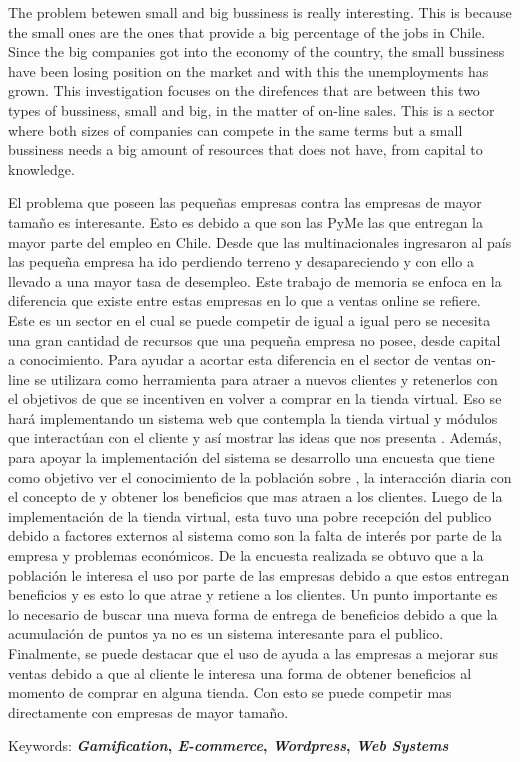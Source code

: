 The problem betewen small and big bussiness is really interesting. This is because the small ones are the ones
that provide a big percentage of the jobs in Chile. Since the big companies got into the economy of the country,
the small bussiness have been losing position on the market and with this the unemployments has grown.
This investigation focuses on the direfences that are between this two types of bussiness, small and big, 
in the matter of on-line sales. This is a sector where both sizes of companies can compete in the same terms but
a small bussiness needs a big amount of resources that does not have, from capital to knowledge.




El problema que poseen las pequeñas empresas contra las empresas de mayor tamaño es interesante. Esto es debido
a que son las PyMe las que entregan la mayor parte del empleo en Chile. Desde que las multinacionales ingresaron
al país las pequeña empresa ha ido perdiendo terreno y desapareciendo y con ello a llevado a una mayor tasa de
desempleo.
Este trabajo de memoria se enfoca en la diferencia que existe entre estas empresas en lo que a ventas online
se refiere. Este es un sector en el cual se puede competir de igual a igual pero se necesita una gran cantidad de
recursos que una pequeña empresa no posee, desde capital a conocimiento.
Para ayudar a acortar esta diferencia en el sector de ventas on-line se utilizara {\gam} como herramienta para
atraer a nuevos clientes y retenerlos con el objetivos de que se incentiven en volver a comprar en la tienda virtual.
Eso se hará implementando un sistema web que contempla la tienda virtual y módulos que interactúan con el cliente
y así mostrar las ideas que nos presenta {\gam}. Además, para apoyar la implementación del sistema se desarrollo
una encuesta que tiene como objetivo ver el conocimiento de la población sobre {\gam}, la interacción diaria con el
concepto de {\gam} y obtener los beneficios que mas atraen a los clientes.
Luego de la implementación de la tienda virtual, esta tuvo una pobre recepción del publico debido a factores
externos al sistema como son la falta de interés por parte de la empresa y problemas económicos. De la encuesta
realizada se obtuvo que a la población le interesa el uso {\gam} por parte de las empresas debido a que estos
entregan beneficios y es esto lo que atrae y retiene a los clientes. Un punto importante es lo necesario
de buscar una nueva forma de entrega de beneficios debido a que la acumulación de puntos ya no es un sistema
interesante para el publico.
Finalmente, se puede destacar que el uso de {\gam} ayuda a las empresas a mejorar sus ventas debido a que al
cliente le interesa una forma de obtener beneficios al momento de comprar en alguna tienda. Con esto se puede
competir mas directamente con empresas de mayor tamaño.



Keywords: \textbf{\emph{Gamification}, \emph{E-commerce}, \emph{Wordpress}, \emph{Web Systems}}
